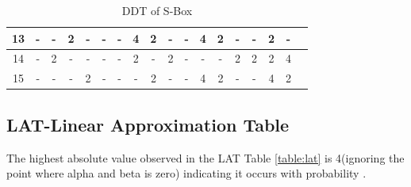 \documentclass[preprint]{transcrypto}
\begin{document}
\begin{table}[H]
\begin{center}
\begin{tabular}{||c||c|c|c|c|c|c|c|c|c|c|c|c|c|c|c|c|c|}
        \hline
        13 &  - &  - & 2 &  - &  - &  - & 4 & 2 &  - &  - & 4 & 2 &  - &  - & 2 &  - \\
        \hline
        14 &  - & 2 &  - &  - &  - &  - & 2 &  - & 2 &  - &  - &  - & 2 & 2 & 2 & 4 \\
        \hline
        15 &  - &  - &  - & 2 &  - &  - &  - & 2 &  - &  - & 4 & 2 &  - &  - & 4 & 2 \\
        \hline
	\end{tabular}
	\end{center}
	\caption{DDT of S-Box}
	\label{table:ddt}
\end{table}

\subsection{LAT-Linear Approximation Table}
The highest absolute value observed in the LAT Table \ref{table:lat} is 4(ignoring the point where alpha and beta is zero) indicating it occurs with probability . 
\end{document}
